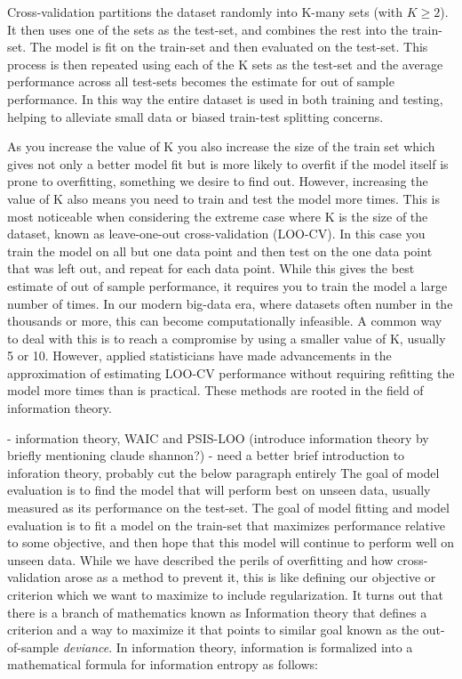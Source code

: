 Cross-validation partitions the dataset randomly into K-many sets (with $K \geq 2$). It then uses one of the sets as the test-set, and combines the rest into the train-set. The model is fit on the train-set and then evaluated on the test-set. This process is then repeated using each of the K sets as the test-set and the average performance across all test-sets becomes the estimate for out of sample performance. In this way the entire dataset is used in both training and testing, helping to alleviate small data or biased train-test splitting concerns.

As you increase the value of K you also increase the size of the train set which gives not only a better model fit but is more likely to overfit if the model itself is prone to overfitting, something we desire to find out. However, increasing the value of K also means you need to train and test the model more times. This is most noticeable when considering the extreme case where K is the size of the dataset, known as leave-one-out cross-validation (LOO-CV). In this case you train the model on all but one data point and then test on the one data point that was left out, and repeat for each data point. While this gives the best estimate of out of sample performance, it requires you to train the model a large number of times. In our modern big-data era, where datasets often number in the thousands or more, this can become computationally infeasible. A common way to deal with this is to reach a compromise by using a smaller value of K, usually 5 or 10. However, applied statisticians have made advancements in the approximation of estimating LOO-CV performance without requiring refitting the model more times than is practical. These methods are rooted in the field of information theory.

- information theory, WAIC and PSIS-LOO
(introduce information theory by briefly mentioning claude shannon?)
- need a better brief introduction to inforation theory, probably cut the below paragraph entirely
The goal of model evaluation is to find the model that will perform best on unseen data, usually measured as its performance on the test-set.
The goal of model fitting and model evaluation is to fit a model on the train-set that maximizes performance relative to some objective, and then hope that this model will continue to perform well on unseen data. While we have described the perils of overfitting and how cross-validation arose as a method to prevent it, this is like defining our objective or criterion which we want to maximize to include regularization. It turns out that there is a branch of mathematics known as Information theory that defines a criterion and a way to maximize it that points to similar goal known as the out-of-sample \textit{deviance}. In information theory, information is formalized into a mathematical formula for information entropy as follows:

